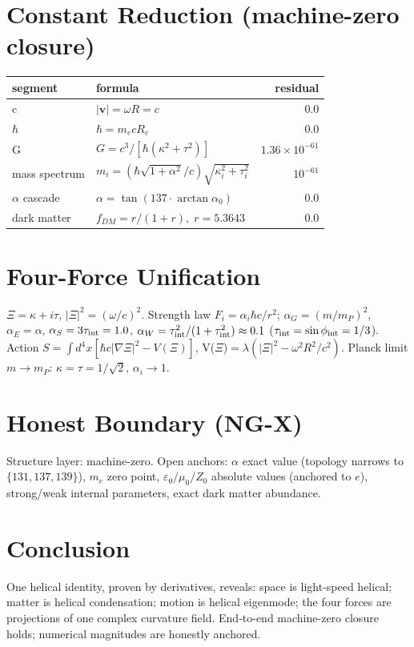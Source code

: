 \documentclass[11pt,a4paper]{article}
\begin{document}
\section{Constant Reduction (machine-zero closure)}
\begin{center}
\begin{tabular}{l|l|r}
segment & formula & residual \\\hline
c & $|\mathbf v|=\omega R=c$ & 0.0 \\
$\hbar$ & $\hbar=m_{e}cR_{e}$ & 0.0 \\
G & $G=c^{3}/[\hbar(\kappa^{2}+\tau^{2})]$ & $1.36\times10^{-61}$ \\
mass spectrum & $m_i=(\hbar\sqrt{1+\alpha^{2}}/c)\sqrt{\kappa_i^{2}+\tau_i^{2}}$ & $10^{-61}$ \\
$\alpha$ cascade & $\alpha=\tan(137\cdot\arctan\alpha_{0})$ & 0.0 \\
dark matter & $f_{DM}=r/(1+r),\; r=5.3643$ & 0.0
\end{tabular}
\end{center}

\section{Four-Force Unification}
$\Xi=\kappa+i\tau$, $|\Xi|^{2}=(\omega/c)^{2}$. Strength law
$F_i=\alpha_i\hbar c/r^{2}$; $\alpha_G=(m/m_P)^{2}$, $\alpha_E=\alpha$,
$\alpha_S=3\tau_{\rm int}=1.0$, $\alpha_W=\tau_{\rm int}^{2}/(1+\tau_{\rm int}^{2})\approx0.1$
($\tau_{\rm int}=\sin\phi_{\rm int}=1/3$). Action
$S=\int d^{4}x[\hbar c|\nabla\Xi|^{2}-V(\Xi)]$,
V($\Xi$)$=\lambda(|\Xi|^{2}-\omega^{2}R^{2}/c^{2})$.
Planck limit $m\to m_P$: $\kappa=\tau=1/\sqrt{2}$, $\alpha_i\to1$.

\section{Honest Boundary (NG-X)}
Structure layer: machine-zero. Open anchors: $\alpha$ exact value (topology
narrows to $\{131,137,139\}$), $m_e$ zero point, $\varepsilon_0/\mu_0/Z_0$
absolute values (anchored to $e$), strong/weak internal parameters, exact dark
matter abundance.

\section{Conclusion}
One helical identity, proven by derivatives, reveals: space is light-speed
helical; matter is helical condensation; motion is helical eigenmode; the four
forces are projections of one complex curvature field. End-to-end machine-zero
closure holds; numerical magnitudes are honestly anchored.
\end{document}
